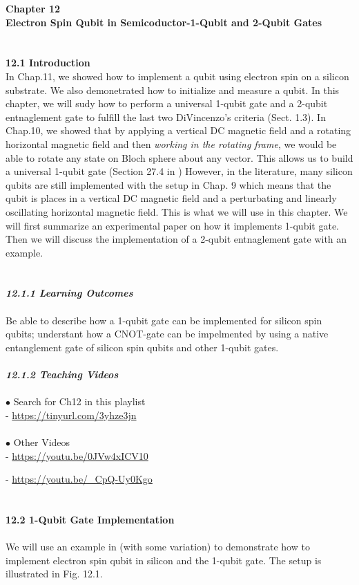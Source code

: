 \documentclass{article}
\newcommand{\bfit}[1]{\textit{\textbf{#1}}}
\begin{document}
\medskip
\noindent
\textbf{\Large Chapter 12\\
Electron Spin Qubit in Semicoductor-1-Qubit and 2-Qubit Gates}\\\\\\
\medskip
\textbf{\large 12.1 Introduction}\\
In Chap.11, we showed how to implement a qubit using electron spin on a silicon
substrate. We also demonetrated how to initialize and measure a qubit. In this chapter,
we will sudy how to perform a universal 1-qubit gate and a 2-qubit entnaglement gate to fulfill
the last two DiVincenzo's criteria (Sect. 1.3). In Chap.10, we showed
that by applying a vertical DC magnetic field and a rotating  horizontal magnetic field and
then \textit{working in the rotating frame}, we would be able to rotate any state on Bloch sphere
about any vector. This allows us to build a universal 1-qubit gate (Section 27.4 in \cite{WongHuiYong})
However, in the literature, many silicon qubits are still implemented with the setup in Chap. 9 which means
that the qubit is places in a vertical DC magnetic field and a perturbating and linearly oscillating horizontal
magnetic field. This is what we will use in this chapter. We will first summarize an experimental paper on how
it implements 1-qubit gate. Then we will discuss the implementation of a 2-qubit entnaglement gate with an example.
\\\\\\
\bfit{\large 12.1.1 Learning Outcomes}
\\\\
Be able to describe how a 1-qubit gate can be implemented for silicon spin qubits; 
understant how a CNOT-gate can be impelmented by using a native entanglement gate of
silicon spin qubits and other 1-qubit gates.
\\\\
\bfit{\large 12.1.2 Teaching Videos}\\\\
$\bullet$ Search for Ch12 in this playlist\\

- \url{https://tinyurl.com/3yhze3jn}\\\\
$\bullet$ Other Videos\\

- \url{https://youtu.be/0JVw4xICV10}

- \url{https://youtu.be/_CpQ-Uy0Kgo}
\\\\\\
\textbf{\large 12.2 1-Qubit Gate Implementation}
\\\\
We will use an example in \cite{veldhorst2014addressable} (with some variation)
to demonstrate how to implement electron spin qubit in silicon and the 1-qubit gate.
The setup is illustrated in Fig. 12.1.
\end{document}
